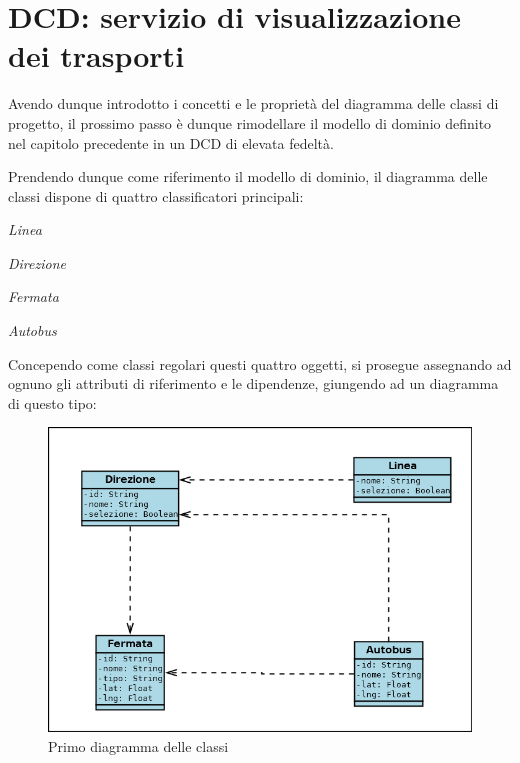 
\section{DCD: servizio di visualizzazione dei trasporti} %
\label{sec:dcd_servizio_di_visualizzazione_dei_trasporti}

Avendo dunque introdotto i concetti e le proprietà del diagramma delle classi di progetto, il prossimo passo è dunque rimodellare il modello di dominio definito nel capitolo precedente in un DCD di elevata fedeltà.

Prendendo dunque come riferimento il modello di dominio, il diagramma delle classi dispone di quattro classificatori principali:

{\itshape Linea}

{\itshape Direzione}

{\itshape Fermata}

{\itshape Autobus}

\newpage

Concependo come classi regolari questi quattro oggetti, si prosegue assegnando ad ognuno gli attributi di riferimento e le dipendenze, giungendo ad un diagramma di questo tipo:

\begin{figure}[htbp]
\begin{center}
\includegraphics[width=14cm]{contents/images/dcd1}
\end{center}
\caption{Primo diagramma delle classi}
\label{fig:dcd}
\end{figure}

